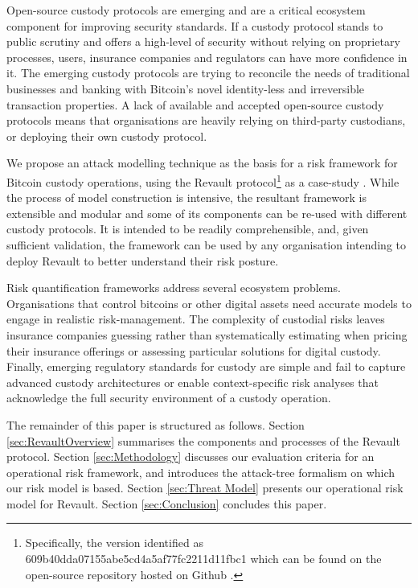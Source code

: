 \documentclass[runningheads]{llncs}
\begin{document}
Open-source custody protocols are emerging \cite{revault-pdf,Glacier,Subzero,Swambo2020vault} and are a critical ecosystem component for improving security standards. If a custody protocol stands to public scrutiny and offers a high-level of security without relying on proprietary processes, users, insurance companies and regulators can have more confidence in it. The emerging custody protocols are trying to reconcile the needs of traditional businesses and banking  with Bitcoin's novel identity-less and irreversible transaction properties. A lack of available and accepted open-source custody protocols means that organisations are heavily relying on third-party custodians, or deploying their own custody protocol.

We propose an attack modelling technique as the basis for a risk framework for Bitcoin custody operations, using the Revault protocol\footnote{Specifically, the version identified as 609b40dda07155abe5cd4a5af77fc2211d11fbc1 which can be found on the open-source repository hosted on Github \cite{practical-revault}.} as a case-study \cite{practical-revault,revault-pdf}. While the process of model construction is intensive, the resultant framework is extensible and modular and some of its components can be re-used with different custody protocols. It is intended to be readily comprehensible, and, given sufficient validation, the framework can be used by any organisation intending to deploy Revault to better understand their risk posture. 

Risk quantification frameworks address several ecosystem problems. Organisations that control bitcoins or other digital assets need accurate models to engage in realistic risk-management.
The complexity of custodial risks leaves insurance companies guessing rather than systematically estimating when pricing their insurance offerings or assessing particular solutions for digital custody. 
Finally, emerging regulatory standards for custody \cite{DACS,CryptoassetCustody} are simple and fail to capture advanced custody architectures or enable context-specific risk analyses that acknowledge the full security environment of a custody operation.    

The remainder of this paper is structured as follows.
Section \ref{sec:RevaultOverview} summarises the components and processes of the Revault protocol. Section \ref{sec:Methodology} discusses our evaluation criteria for an operational risk framework, and introduces the attack-tree formalism on which our risk model is based. Section \ref{sec:Threat Model} presents our operational risk model for Revault. Section \ref{sec:Conclusion} concludes this paper. 
\end{document}
